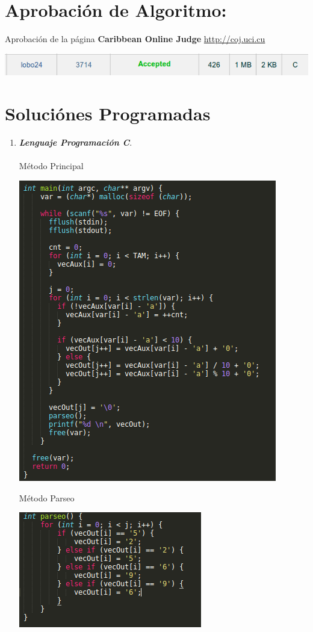 \documentclass[12pt,a4paper]{article}
\begin{document}
\section{Aprobaci\'on de Algoritmo: }
Aprobaci\'on de la p\'agina \textbf{Caribbean Online Judge} \url{http://coj.uci.cu}
\begin{center} 
\includegraphics[scale=0.5]{aceptacion}
\end{center}

\section{Soluci\'ones Programadas}
\begin{enumerate}
\item \textbf{\textit{Lenguaje Programaci\'on C}}. \\\\
M\'etodo Principal
\begin{center} 
\includegraphics[scale=0.5]{principalC}
\end{center}

M\'etodo Parseo
\begin{center} 
\includegraphics[scale=0.8]{parseoC}
\end{center}


\end{enumerate}
\end{document}
